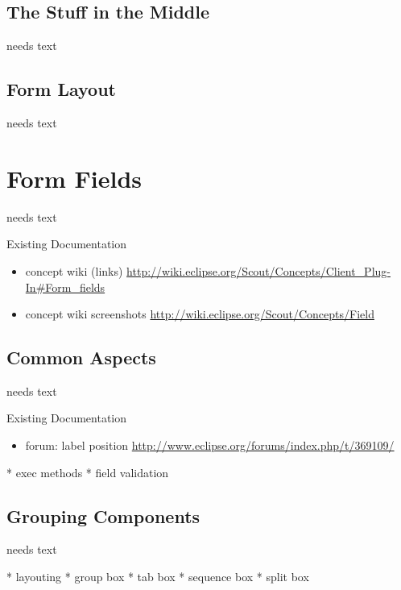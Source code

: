 \documentclass[a4paper,10pt,twoside]{book}
\begin{document}
\section{The Stuff in the Middle}
needs text

\section{Form Layout}
needs text

\chapter{Form Fields}
needs text

\noindent Existing Documentation
\begin{itemize}
  \item concept wiki (links) \url{http://wiki.eclipse.org/Scout/Concepts/Client_Plug-In#Form_fields}
  \item concept wiki screenshots \url{http://wiki.eclipse.org/Scout/Concepts/Field}
\end{itemize}

\section{Common Aspects}
needs text

\noindent Existing Documentation
\begin{itemize}
  \item forum: label position \url{http://www.eclipse.org/forums/index.php/t/369109/}
\end{itemize}

* exec methods
* field validation

	
\section{Grouping Components}
needs text

* layouting
* group box
* tab box
* sequence box 
* split box

\end{document}
